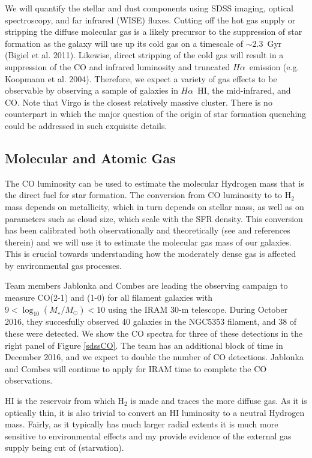 \documentclass[11pt, preprint]{aastex}
\newcommand{\ha}{$H\alpha$}
\begin{document}
We will quantify the stellar and dust components using
SDSS imaging, optical spectroscopy, and
far infrared (WISE) fluxes.  Cutting off the hot gas supply or stripping the diffuse molecular gas
is a likely precursor to the suppression of star formation as the
galaxy will use up its cold gas on a timescale of $\sim 2.3$~Gyr
(Bigiel et al. 2011).  Likewise, direct stripping of the cold gas will
result in a suppression of the CO and infrared luminosity and
truncated \ha \ emission (e.g. Koopmann et al. 2004).  Therefore,
we expect a variety of gas effects to be observable by observing a
sample of galaxies in \ha\, HI, the mid-infrared, and CO.
Note that Virgo is the closest relatively massive cluster. There is no counterpart
in which the major question of the origin of star formation quenching could be
addressed in such exquisite details.

\vspace*{-1cm}
\subsection{Molecular and Atomic Gas}
\vspace*{-.3cm}

The CO luminosity can be used to estimate the molecular Hydrogen mass that is the direct fuel for star formation.  The conversion from CO luminosity to to H$_2$ mass depends on metallicity, which in turn depends on stellar mass, as well as on parameters such as cloud size, which scale with the SFR density.  This conversion has been calibrated both observationally and theoretically (see \citet{Bolatto13} and references therein) and we will use it to estimate the molecular gas mass of our galaxies.  This is crucial towards understanding how the moderately dense gas is affected by environmental gas processes.

Team members Jablonka and Combes are leading the observing campaign to
measure CO(2-1) and (1-0)  for all filament galaxies with $9 <
\log_{10}(M_\star/M_\odot) < 10$ using the IRAM 30-m telescope.
During October 2016, they succesfully observed 40 galaxies in the
NGC5353 filament, and 38 of these were detected.  We show the CO
spectra for three of these detections in the right panel of Figure
\ref{sdssCO}.  The team has an additional block of time in December
2016, and we expect to double the number of CO detections.  Jablonka
and Combes will continue to apply for IRAM time to complete the CO observations.

HI is the reservoir from which H$_2$ is made and traces the more diffuse gas.  As it is optically thin, it is also trivial to convert an HI luminosity to a neutral Hydrogen mass.  Fairly, as it typically has much larger radial extents it is much more sensitive to environmental effects and my provide evidence of the external gas supply being cut of (starvation).  
\end{document}
